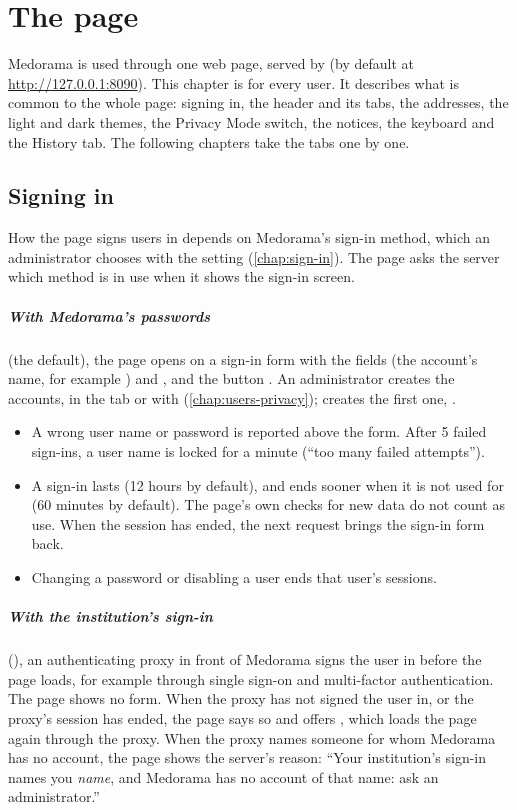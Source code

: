 \chapter{The page}
\label{chap:page}

Medorama is used through one web page, served by  (by default at
\url{http://127.0.0.1:8090}). This chapter is for every user. It describes what is common to the
whole page: signing in, the header and its tabs, the addresses, the light and dark themes, the
Privacy Mode switch, the notices, the keyboard and the History tab. The following chapters take
the tabs one by one.

\section{Signing in}
\label{sec:page-signing-in}

How the page signs users in depends on Medorama's sign-in method, which an administrator
chooses with the setting  (\cref{chap:sign-in}). The page asks the server which
method is in use when it shows the sign-in screen.

\paragraph{With Medorama's passwords} (the default), the page opens on a sign-in form with the
fields  (the account's name, for example ) and , and the
button . An administrator creates the accounts, in the  tab or with
 (\cref{chap:users-privacy});  creates the first one,
.
\begin{itemize}
\item A wrong user name or password is reported above the form. After 5 failed sign-ins, a user
  name is locked for a minute (``too many failed attempts'').
\item A sign-in lasts  (12 hours by default), and ends sooner when it is not
  used for  (60 minutes by default). The page's own checks for new
  data do not count as use. When the session has ended, the next request brings the sign-in form
  back.
\item Changing a password or disabling a user ends that user's sessions.
\end{itemize}

\paragraph{With the institution's sign-in} (), an authenticating proxy
in front of Medorama signs the user in before the page loads, for example through single sign-on
and multi-factor authentication. The page shows no form. When the proxy has not signed the user
in, or the proxy's session has ended, the page says so and offers , which loads the
page again through the proxy. When the proxy names someone for whom Medorama has no account, the
page shows the server's reason: ``Your institution's sign-in names you \textit{name}, and
Medorama has no account of that name: ask an administrator.''

